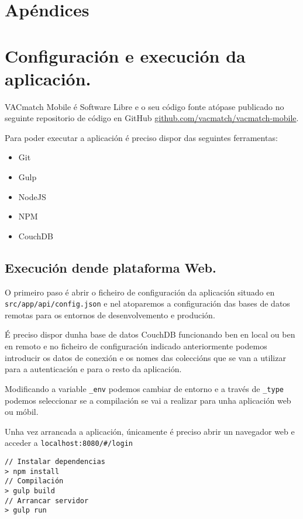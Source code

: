 \newpage
\chapter*{Apéndices}
\thispagestyle{empty}
\newpage

\chapter{Configuración e execución da aplicación.}
\label{chap:compilacion_aplicacion}
VACmatch Mobile é Software Libre e o seu código fonte atópase publicado no 
seguinte repositorio de código en GitHub 
\href{https://github.com/vacmatch/vacmatch-mobile}{
github.com/vacmatch/vacmatch-mobile}.

Para poder executar a aplicación é preciso dispor das seguintes ferramentas:

\begin{itemize}
 \item Git
 \item Gulp
 \item NodeJS
 \item NPM
 \item CouchDB
\end{itemize}

  \section{Execución dende plataforma Web.}

  O primeiro paso é abrir o ficheiro de configuración da aplicación situado en 
\lstinline{src/app/api/config.json} e nel atoparemos a configuración das bases 
de datos remotas para os entornos de desenvolvemento e produción.

  É preciso dispor dunha base de datos CouchDB funcionando ben en local ou ben 
en remoto e no ficheiro de configuración indicado anteriormente podemos 
introducir os datos de conexión e os nomes das coleccións que se van a 
utilizar para a autenticación e para o resto da aplicación.

  Modificando a variable \lstinline{_env} podemos cambiar de entorno e 
a través de \lstinline{_type} podemos seleccionar se a compilación se vai a 
realizar para unha aplicación web ou móbil.

  Unha vez arrancada a aplicación, únicamente é preciso abrir un 
navegador web e acceder a \lstinline{localhost:8080/#/login}

      \lstset{}
      \begin{lstlisting}[caption=Configuración e execución web]
// Instalar dependencias
> npm install
// Compilación
> gulp build
// Arrancar servidor
> gulp run
      \end{lstlisting}

